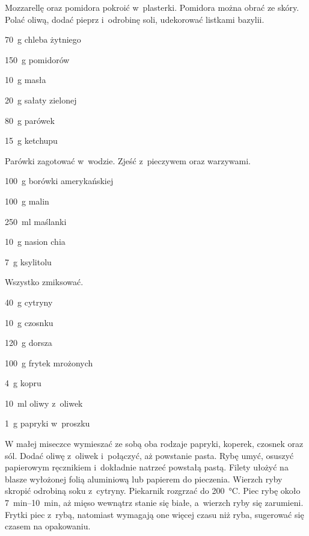 \documentclass[../kucharek.tex]{subfiles}
\begin{document}
Mozzarellę oraz pomidora pokroić w~plasterki. Pomidora można obrać ze skóry.
Polać oliwą, dodać pieprz i~odrobinę soli, udekorować listkami bazylii.


\begin{Ingred}
    \item \qty{70}{\gram} chleba żytniego
    \item \qty{150}{\gram} pomidorów
    \item \qty{10}{\gram} masła
    \item \qty{20}{\gram} sałaty zielonej
    \item \qty{80}{\gram} parówek
    \item \qty{15}{\gram} ketchupu
\end{Ingred}

Parówki zagotować w~wodzie. Zjeść z~pieczywem oraz warzywami.


\begin{Ingred}
    \item \qty{100}{\gram} borówki amerykańskiej
    \item \qty{100}{\gram} malin
    \item \qty{250}{\milli\litre} maślanki
    \item \qty{10}{\gram} nasion chia
    \item \qty{7}{\gram} ksylitolu
\end{Ingred}

Wszystko zmiksować.


\begin{Ingred}
    \item \qty{40}{\gram} cytryny
    \item \qty{10}{\gram} czosnku
    \item \qty{120}{\gram} dorsza
    \item \qty{100}{\gram} frytek mrożonych
    \item \qty{4}{\gram} kopru
    \item \qty{10}{\milli\litre} oliwy z~oliwek
    \item \qty{1}{\gram} papryki w~proszku
\end{Ingred}

W małej miseczce wymieszać ze sobą oba rodzaje papryki, koperek, czosnek oraz
sól. Dodać oliwę z~oliwek i~połączyć, aż powstanie pasta. Rybę umyć, osuszyć
papierowym ręcznikiem i~dokładnie natrzeć powstałą pastą. Filety ułożyć na
blasze wyłożonej folią aluminiową lub papierem do pieczenia. Wierzch ryby
skropić odrobiną soku z~cytryny. Piekarnik rozgrzać do \qty{200}{\celsius}.
Piec rybę około \qtyrange{7}{10}{\minute}, aż mięso wewnątrz stanie się białe,
a~wierzch ryby się zarumieni. Frytki piec z~rybą, natomiast wymagają one więcej
czasu niż ryba, sugerować się czasem na opakowaniu.
\end{document}

